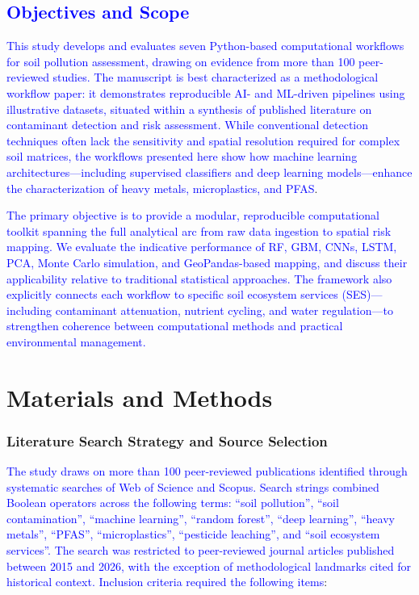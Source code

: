 \documentclass[environments,article,submit,pdftex,moreauthors]{Definitions/mdpi}
\begin{document}
\subsection{\textcolor{blue}{Objectives and Scope}}\label{sec1.3}

\textcolor{blue}{This study develops and evaluates seven Python-based computational workflows for soil pollution assessment, drawing on evidence from more than 100 peer-reviewed studies. The manuscript is best characterized as a methodological workflow paper: it demonstrates reproducible AI- and ML-driven pipelines using illustrative  datasets, situated within a synthesis of published literature on contaminant detection and risk assessment. While conventional detection techniques often lack the sensitivity and spatial resolution required for complex soil matrices, the workflows presented here show how machine learning architectures---including supervised classifiers and deep learning models---enhance the characterization of heavy metals, microplastics, and PFAS}.

\textcolor{blue}{The primary objective is to provide a modular, reproducible computational toolkit spanning the full analytical arc from raw data ingestion to spatial risk mapping. We evaluate the indicative performance of RF, GBM, CNNs, LSTM, PCA, Monte Carlo simulation, and GeoPandas-based mapping, and discuss their applicability relative to traditional statistical approaches. The framework also explicitly connects each workflow to specific soil ecosystem services (SES)---including contaminant attenuation, nutrient cycling, and water regulation---to strengthen coherence between computational methods and practical environmental management.}

\section{Materials and Methods}\label{sec2}

\subsubsection{Literature Search Strategy and Source Selection}\label{sec2.0.1}

\textcolor{blue}{The study draws on more than 100 peer-reviewed publications
identified through systematic searches of Web of Science and Scopus.
Search strings combined Boolean operators across the following terms:
``soil pollution'', ``soil contamination'', ``machine learning'',
``random forest'', ``deep learning'', ``heavy metals'', ``PFAS'',
``microplastics'', ``pesticide leaching'', and ``soil ecosystem
services''. The search was restricted to peer-reviewed journal articles
published between 2015 and 2026, with the exception of methodological
landmarks cited for historical context. Inclusion criteria required the following items}:
\end{document}
